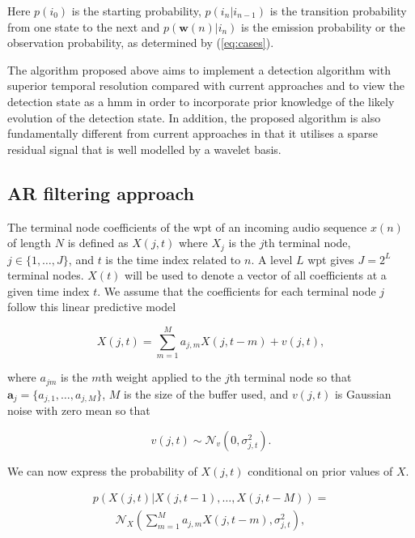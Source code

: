 Here $p(i_{0})$ is the starting probability, $p(i_n | i_{n-1})$ is the transition probability from one state to the next and $p(\boldsymbol{w}(n) | i_n)$ is the emission probability or the observation probability, as determined by (\ref{eq:cases}).

The algorithm proposed above aims to implement a detection algorithm with superior temporal resolution compared with current approaches and to view the detection state as a \gls{hmm} in order to incorporate prior knowledge of the likely evolution of the detection state. In addition, the proposed algorithm is also fundamentally different from current approaches in that it utilises a sparse residual signal that is well modelled by a wavelet basis.

\subsection{AR filtering approach}\label{sec:WPdetectionAR}

The terminal node coefficients of the \gls{wpt} of an incoming audio sequence $x(n)$ of length $N$ is defined as $X(j,t)$ where $X_j$ is the $j$th terminal node, $j \in \{1, \ldots, J\}$, and $t$ is the time index related to $n$. A level $L$ \gls{wpt} gives $J = 2^L$ terminal nodes. $X(t)$ will be used to denote a vector of all coefficients at a given time index $t$. We assume that the coefficients for each terminal node $j$ follow this linear predictive model

\begin{equation}\label{eq:lpm}
X(j,t) = \sum_{m=1}^{M} a_{j,m} X(j,t - m) + v(j,t),
\end{equation}

where $a_{jm}$ is the $m$th weight applied to the $j$th terminal node so that $\mathbf{a}_j = \{a_{j,1}, \ldots, a_{j,M} \}$, $M$ is the size of the buffer used, and $v(j,t)$ is Gaussian noise with zero mean so that

\begin{equation}\label{eq:lpmnoise}
v(j,t) \sim \mathcal{N}_v(0,\sigma^2_{j,t}).
\end{equation}

We can now express the probability of $X(j,t)$ conditional on prior values of $X$.

\begin{align}\label{eq:likelihood}
p\left(X\left(j,t\right)|X\left(j,t-1\right),\ldots,X\left(j,t-M\right)\right) = \nonumber\\
\qquad \mathcal{N}_X\left( \sum_{m=1}^M a_{j,m} X(j,t - m), \sigma_{j,t}^2\right),
\end{align}

